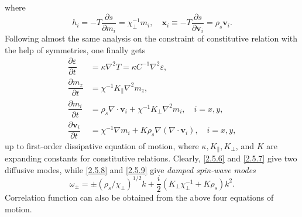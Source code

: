 \documentclass[10pt,nofootinbib,letterpaper]{revtex4}
\begin{document}
		where
		\begin{equation}\label{2.5.5}
			h_i=-T\dfrac{\partial s}{\partial m_i}=\chi_\perp^{-1}m_i,\quad \bm{x}_i\equiv-T\dfrac{\partial s}{\partial \bm{v}_i}=\rho_s\bm{v}_i.
		\end{equation}
		Following almost the same analysis on the constraint of constitutive relation with the help of symmetries, one finally gets
		\begin{align}
			\dfrac{\partial \varepsilon}{\partial t}&=\kappa\nabla^2T=\kappa C^{-1}\nabla^2 \varepsilon,\label{2.5.6}\\
			\dfrac{\partial m_z}{\partial t}&=\chi^{-1}K_\parallel\nabla^2 m_z,\label{2.5.7}\\
			\dfrac{\partial m_i}{\partial t}&=\rho_s\nabla\cdot\bm{v}_i+\chi^{-1}K_\perp\nabla^2 m_i,\quad i=x,y,\label{2.5.8}\\
			\dfrac{\partial \bm{v}_i}{\partial t}&=\chi^{-1}\nabla m_i+K\rho_s\nabla(\nabla\cdot\bm{v}_i),\quad i=x,y,\label{2.5.9}
		\end{align}
		up to first-order dissipative equation of motion, where $\kappa,K_\parallel,K_\perp$, and $K$ are expanding constants for constitutive relations. Clearly, \eqref{2.5.6} and \eqref{2.5.7} give two diffusive modes, while \eqref{2.5.8} and \eqref{2.5.9} give \emph{damped spin-wave modes}
		\begin{equation}\label{2.5.10}
			\omega_\pm=\pm(\rho_s/\chi_\perp)^{1/2}k+\dfrac{i}{2}(K_\perp\chi_\perp^{-1}+K\rho_s)k^2.
		\end{equation}
		Correlation function can also be obtained from the above four equations of motion.
\end{document}
